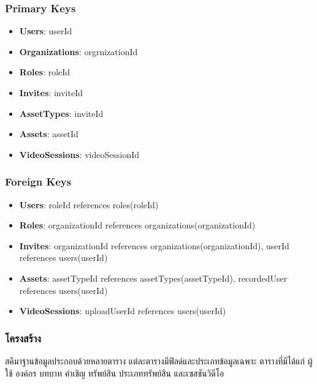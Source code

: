\subsubsection{Primary Keys}
\begin{itemize}
    \item \textbf{Users}: userId
    \item \textbf{Organizations}: orgrnizationId
    \item \textbf{Roles}: roleId
    \item \textbf{Invites}: inviteId
    \item \textbf{AssetTypes}: inviteId
    \item \textbf{Assets}: assetId
    \item \textbf{VideoSessions}: videoSessionId
\end{itemize}

\clearpage

\subsubsection{Foreign Keys}
\begin{itemize}
    \item \textbf{Users}: roleId references roles(roleId)
    \item \textbf{Roles}: organizationId references organizations(organizationId)
    \item \textbf{Invites}: organizationId references organizations(organizationId), userId references users(userId)
    \item \textbf{Assets}: assetTypeId references assetTypes(assetTypeId), recordedUser references users(userId)
    \item \textbf{VideoSessions}: uploadUserId references users(userId)
\end{itemize}

\else
\subsubsection{โครงสร้าง}
สคีมาฐานข้อมูลประกอบด้วยหลายตาราง แต่ละตารางมีฟิลด์และประเภทข้อมูลเฉพาะ ตารางที่มีได้แก่ ผู้ใช้ องค์กร บทบาท คำเชิญ ทรัพย์สิน ประเภททรัพย์สิน และเซสชันวิดีโอ


